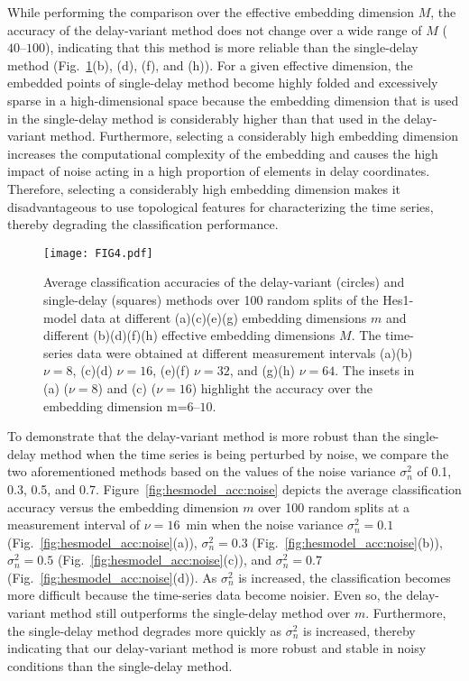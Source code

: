 \documentclass[twocolumn,pre,amsmath,amssymb]{revtex4-1}
\begin{document}
While performing the comparison over the effective embedding dimension $M$, 
the accuracy of the delay-variant method does not change 
over a wide range of $M$ ($40\text{--}100$), 
indicating that this method is more reliable than the single-delay method 
(Fig.~\ref{fig:hesmodel_acc}(b), (d), (f), and (h)).
For a given effective dimension, the embedded points of 
single-delay method become highly folded 
and excessively sparse in a high-dimensional space
because the embedding dimension that is used in the single-delay method 
is considerably higher than that used in the delay-variant method.
Furthermore, selecting a considerably high embedding dimension 
increases the computational complexity of the embedding
and causes the high impact of noise acting in a high 
proportion of elements in delay coordinates.
Therefore, selecting a considerably high embedding dimension makes it
disadvantageous to use topological features for characterizing the time series,
thereby degrading the classification performance.

\begin{figure}
	\texttt{[image: FIG4.pdf]}
	
	\protect\caption{
	Average classification accuracies of the delay-variant (circles) and single-delay (squares) 
	methods over 100 random splits of the Hes1-model data 
	at different (a)(c)(e)(g) embedding dimensions $m$ and different (b)(d)(f)(h) effective embedding dimensions $M$.
	The time-series data were obtained at different
	measurement intervals (a)(b) $\nu=8$, (c)(d) $\nu=16$, (e)(f) $\nu=32$, and (g)(h) $\nu=64$.
    The insets in (a) ($\nu=8$) and (c) ($\nu=16$) highlight the accuracy over the embedding dimension m=$6\text{--}10$.}
		\label{fig:hesmodel_acc}
\end{figure}

To demonstrate that the delay-variant method is more robust than the single-delay method 
when the time series is being perturbed by noise,
we compare the two aforementioned methods based on the values of the noise variance $\sigma^2_n$ 
of 0.1, 0.3, 0.5, and 0.7.
Figure~\ref{fig:hesmodel_acc:noise} depicts the average classification accuracy 
versus the embedding dimension $m$ over 100 random splits 
at a measurement interval of $\nu=16$~min when the noise variance
$\sigma^2_n=0.1$ (Fig.~\ref{fig:hesmodel_acc:noise}(a)), 
$\sigma^2_n=0.3$ (Fig.~\ref{fig:hesmodel_acc:noise}(b)), 
$\sigma^2_n=0.5$ (Fig.~\ref{fig:hesmodel_acc:noise}(c)),
and $\sigma^2_n=0.7$ (Fig.~\ref{fig:hesmodel_acc:noise}(d)).
As $\sigma^2_n$ is increased, the classification becomes more difficult 
because the time-series data become noisier.
Even so, the delay-variant method still outperforms the single-delay method over $m$. 
Furthermore, the single-delay method degrades more quickly as $\sigma^2_n$
is increased, thereby indicating that our delay-variant method is more robust and stable
in noisy conditions than the single-delay method.
\end{document}

